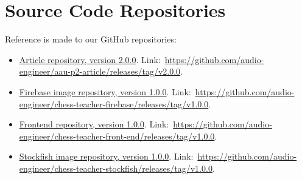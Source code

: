 \chapter{Source Code Repositories}\label{ch:source-code-repositories}

Reference is made to our GitHub repositories:

\begin{itemize}
    \item \href{https://github.com/audio-engineer/aau-p2-article/releases/tag/v2.0.0}
    {Article repository, version 2.0.0}.
    Link:~\url{https://github.com/audio-engineer/aau-p2-article/releases/tag/v2.0.0}.
    \item \href{https://github.com/audio-engineer/chess-teacher-firebase/releases/tag/v1.0.0}
    {Firebase image repository, version 1.0.0}.
    Link:~\url{https://github.com/audio-engineer/chess-teacher-firebase/releases/tag/v1.0.0}.
    \item \href{https://github.com/audio-engineer/chess-teacher-front-end/releases/tag/v1.0.0}
    {Frontend repository, version 1.0.0}.
    Link:~\url{https://github.com/audio-engineer/chess-teacher-front-end/releases/tag/v1.0.0}.
    \item \href{https://github.com/audio-engineer/chess-teacher-stockfish/releases/tag/v1.0.0}
    {Stockfish image repository, version 1.0.0}.
    Link:~\url{https://github.com/audio-engineer/chess-teacher-stockfish/releases/tag/v1.0.0}.
\end{itemize}

